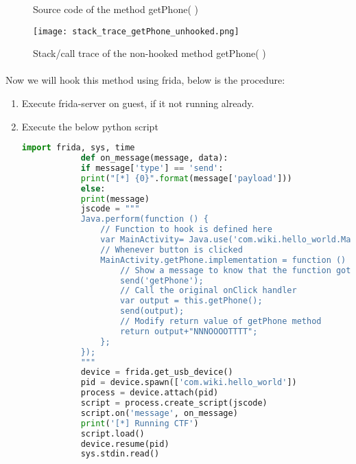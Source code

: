 \documentclass[../main.tex]{subfile}
\begin{document}
	\begin{figure}
		\caption{Source code of the method getPhone( )}
		\label{fig:getPhone_source}
	\end{figure}
	
	\begin{figure}
		\centering
		\texttt{[image: stack\_trace\_getPhone\_unhooked.png]}
		\caption{Stack/call trace of the non-hooked method getPhone( )}
		\label{fig:getPhone_trace}
	\end{figure}
	
	
	\paragraph{} Now we will hook this method using frida, below is the procedure:
	\begin{enumerate}
		\item Execute frida-server on guest, if it not running already.
		\item Execute the below python script
		\begin{lstlisting}[language=python]
			import frida, sys, time
			def on_message(message, data):
			if message['type'] == 'send':
			print("[*] {0}".format(message['payload']))
			else:
			print(message)
			jscode = """
			Java.perform(function () {
				// Function to hook is defined here
				var MainActivity= Java.use('com.wiki.hello_world.MainActivity');
				// Whenever button is clicked
				MainActivity.getPhone.implementation = function () {
					// Show a message to know that the function got called
					send('getPhone');
					// Call the original onClick handler
					var output = this.getPhone();
					send(output);
					// Modify return value of getPhone method
					return output+"NNNOOOOTTTT";
				};
			});
			"""
			device = frida.get_usb_device()
			pid = device.spawn(['com.wiki.hello_world'])
			process = device.attach(pid)
			script = process.create_script(jscode)
			script.on('message', on_message)
			print('[*] Running CTF')
			script.load()
			device.resume(pid)
			sys.stdin.read()
		\end{lstlisting}
	\end{enumerate}
\end{document}
